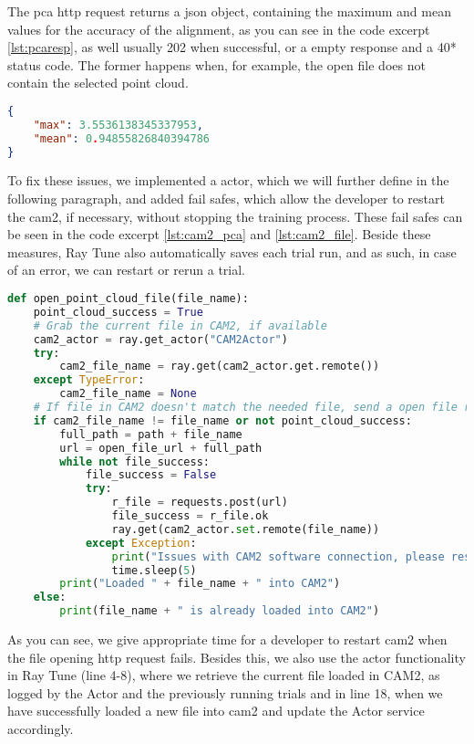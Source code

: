 The \acrshort{pca} \acrshort{http} request returns a \acrshort{json} object, containing the maximum and mean values for the accuracy of the alignment, as you can see in the code excerpt \ref{lst:pcaresp}, as well  usually 202 when successful, or a empty response and a 40* status code. The former happens when, for example, the open file does not contain the selected point cloud.

\begin{lstlisting}[language=json, caption=Example \acrshort{pca} \acrshort{http} request response, captionpos=b, label={lst:pcaresp}]
{
    "max": 3.5536138345337953,
    "mean": 0.94855826840394786
}
\end{lstlisting}

To fix these issues, we implemented a actor, which we will further define in the following paragraph, and added fail safes, which allow the developer to restart the \acrshort{cam2}, if necessary, without stopping the training process. These fail safes can be seen in the code excerpt \ref{lst:cam2_pca} and \ref{lst:cam2_file}. Beside these measures, Ray Tune also automatically saves each trial run, and as such, in case of an error, we can restart or rerun a trial.

\begin{lstlisting}[language=Python, caption=Opening a \acrshort{fcd} file in \acrshort{cam2}, captionpos=b, label={lst:cam2_pca}]
def open_point_cloud_file(file_name):
    point_cloud_success = True
    # Grab the current file in CAM2, if available
    cam2_actor = ray.get_actor("CAM2Actor")
    try:
        cam2_file_name = ray.get(cam2_actor.get.remote())
    except TypeError:
        cam2_file_name = None
    # If file in CAM2 doesn't match the needed file, send a open file request
    if cam2_file_name != file_name or not point_cloud_success:
        full_path = path + file_name
        url = open_file_url + full_path
        while not file_success:
            file_success = False
            try:
                r_file = requests.post(url)
                file_success = r_file.ok
                ray.get(cam2_actor.set.remote(file_name))
            except Exception:
                print("Issues with CAM2 software connection, please restart the CAM2 software.")
                time.sleep(5)
        print("Loaded " + file_name + " into CAM2")
    else:
        print(file_name + " is already loaded into CAM2")
\end{lstlisting}

As you can see, we give appropriate time for a developer to restart \acrshort{cam2} when the file opening \acrshort{http} request fails. Besides this, we also use the actor functionality in Ray Tune (line 4-8), where we retrieve the current file loaded in CAM2, as logged by the Actor and the previously running trials and in line 18, when we have successfully loaded a new file into \acrshort{cam2} and update the Actor service accordingly.

